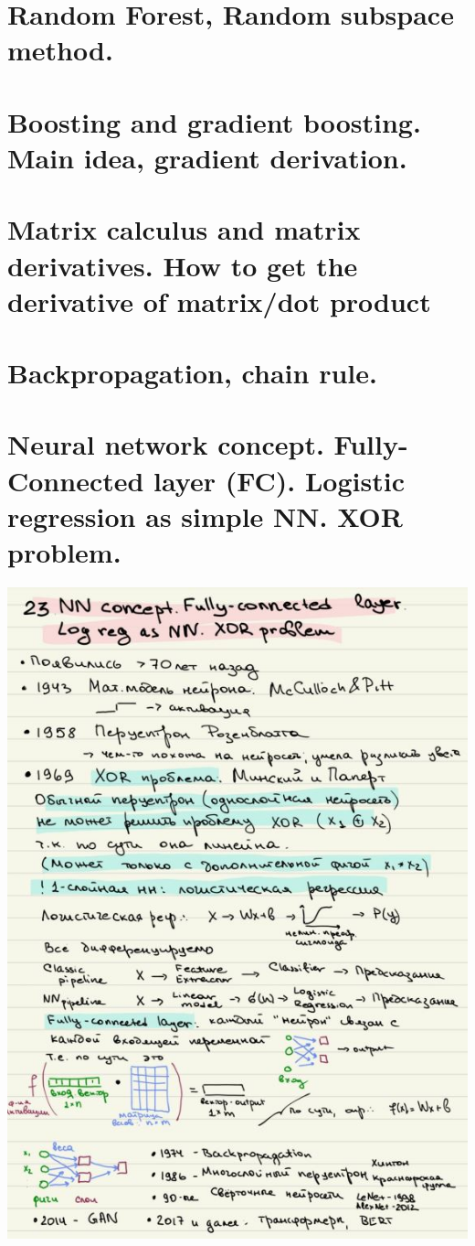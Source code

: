 \section{Random Forest, Random subspace method.}


\section{Boosting and gradient boosting. Main idea, gradient derivation.}


\section{Matrix calculus and matrix derivatives. How to get the derivative of matrix/dot product}

\section{Backpropagation, chain rule.}

\section{Neural network concept. Fully-Connected layer (FC). Logistic regression as simple NN. XOR problem.}
\includegraphics[width=400pt]{images/23.JPG}
\newpage

